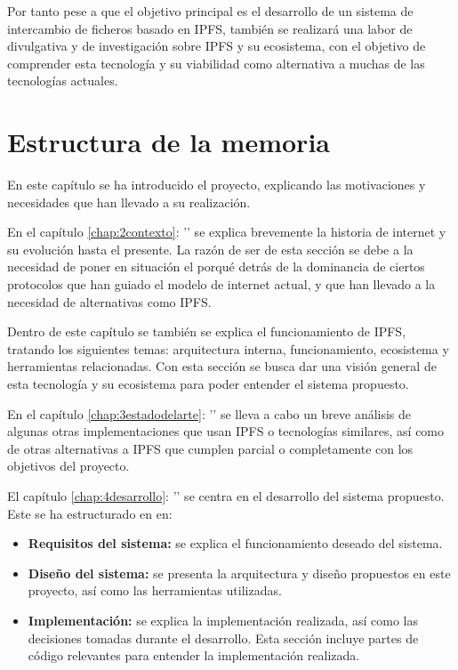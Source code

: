 Por tanto pese a que el objetivo principal es el desarrollo de un sistema de intercambio de ficheros basado en IPFS,
también se realizará una labor de divulgativa y de investigación sobre IPFS y su ecosistema, con el objetivo de comprender esta
tecnología y su viabilidad como alternativa a muchas de las tecnologías actuales.


\section{Estructura de la memoria}
En este capítulo se ha introducido el proyecto, explicando las motivaciones y necesidades que han llevado a su realización.

En el capítulo \ref{chap:2contexto}: '' se explica brevemente la historia de internet y su evolución hasta el presente.
La razón de ser de esta sección se debe a la necesidad de poner en situación el porqué detrás de la dominancia de ciertos
protocolos que han guiado el modelo de internet actual, y que han llevado a la necesidad de alternativas como IPFS.

Dentro de este capítulo se también se explica el funcionamiento de IPFS, tratando los siguientes temas: arquitectura interna, funcionamiento,
ecosistema y herramientas relacionadas. Con esta sección se busca dar una visión general de esta tecnología y su ecosistema para
poder entender el sistema propuesto.

En el capítulo \ref{chap:3estadodelarte}: '' se lleva a cabo un breve análisis
de algunas otras implementaciones que usan IPFS o tecnologías similares, así como de otras alternativas a IPFS que cumplen
parcial o completamente con los objetivos del proyecto.

El capítulo \ref{chap:4desarrollo}: '' se centra en el desarrollo del sistema propuesto. Este se ha estructurado en en:
\begin{itemize}
      \item \textbf{Requisitos del sistema:} se explica el funcionamiento deseado del sistema.
      \item \textbf{Diseño del sistema:} se presenta la arquitectura y diseño propuestos en este proyecto, así como las herramientas utilizadas.
      \item \textbf{Implementación:} se explica la implementación realizada, así como las decisiones tomadas durante el desarrollo. Esta sección
            incluye partes de código relevantes para entender la implementación realizada.
\end{itemize}

